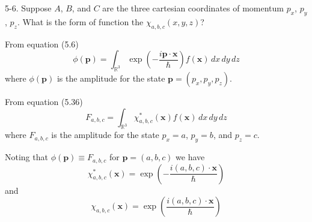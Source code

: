 \documentclass[12pt]{article}
\newcommand\INT{\int_{\mathbb R^3}}
\begin{document}
5-6.
Suppose $A$, $B$, and $C$ are the three cartesian coordinates
of momentum $p_x$, $p_y$, $p_z$.
What is the form of function the $\chi_{a,b,c}(x,y,z)$?

\bigskip
From equation (5.6)
\begin{equation*}
\phi(\mathbf p)=\INT\exp\left(-\frac{i\mathbf p\cdot\mathbf x}{\hbar}\right)f(\mathbf x)\,dx\,dy\,dz
\end{equation*}
where $\phi(\mathbf p)$ is the amplitude for the state $\mathbf p=(p_x,p_y,p_z)$.

\bigskip
From equation (5.36)
\begin{equation*}
F_{a,b,c}=\INT\chi_{a,b,c}^*(\mathbf x)f(\mathbf x)\,dx\,dy\,dz
\end{equation*}
where $F_{a,b,c}$ is the amplitude for the state $p_x=a$, $p_y=b$, and $p_z=c$.

\bigskip
Noting that $\phi(\mathbf p)\equiv F_{a,b,c}$ for $\mathbf p=(a,b,c)$ we have
\begin{equation*}
\chi_{a,b,c}^*(\mathbf x)=\exp\left(-\frac{i(a,b,c)\cdot\mathbf x}{\hbar}\right)
\end{equation*}
and
\begin{equation*}
\chi_{a,b,c}(\mathbf x)=\exp\left(\frac{i(a,b,c)\cdot\mathbf x}{\hbar}\right)
\end{equation*}
\end{document}
